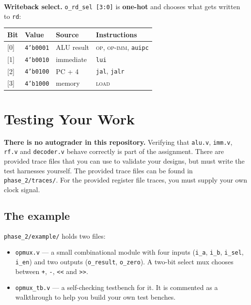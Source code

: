 \documentclass[11pt]{article}
\begin{document}
\textbf{Writeback select.} \texttt{o\_rd\_sel [3:0]} is \textbf{one-hot} and
chooses what gets written to \texttt{rd}:

\begin{center}
\begin{tabular}{@{}llll@{}}
\toprule
\textbf{Bit} & \textbf{Value} & \textbf{Source} & \textbf{Instructions} \\
\midrule
{}[0] & \texttt{4'b0001} & ALU result & \textsc{op}, \textsc{op-imm}, \texttt{auipc} \\
{}[1] & \texttt{4'b0010} & immediate  & \texttt{lui} \\
{}[2] & \texttt{4'b0100} & PC + 4     & \texttt{jal}, \texttt{jalr} \\
{}[3] & \texttt{4'b1000} & memory     & \textsc{load} \\
\bottomrule
\end{tabular}
\end{center}



\newpage

\section{Testing Your Work}
\label{sec:testing}
\textbf{There is no autograder in this repository.} Verifying that
\texttt{alu.v}, \texttt{imm.v}, \texttt{rf.v} and \texttt{decoder.v} behave
correctly is part of the assignment. There are provided trace files that you can use to validate your designs, but must write the test harnesses yourself. The provided trace files can be found in \texttt{phase\_2/traces/}. For the provided register file traces, you must supply your own clock signal.

\subsection{The example}
\texttt{phase\_2/example/} holds two files:

\begin{itemize}
\item \texttt{opmux.v} --- a small combinational module with four inputs
  (\texttt{i\_a}, \texttt{i\_b}, \texttt{i\_sel}, \texttt{i\_en}) and two
  outputs (\texttt{o\_result}, \texttt{o\_zero}). A two-bit select mux chooses
  between \texttt{+}, \texttt{-}, \texttt{<<} and \texttt{>>}.
\item \texttt{opmux\_tb.v} --- a self-checking testbench for it. It is commented as a walkthrough to help you build your own test benches.
\end{itemize}
\end{document}
